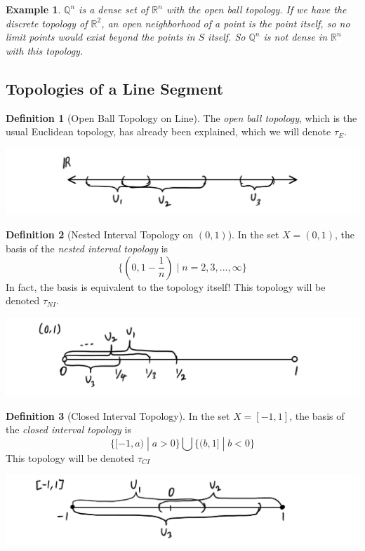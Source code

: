 \documentclass{article}
\newtheorem{example}{Example}[section]
\theoremstyle{remark}
\theoremstyle{definition}
\newtheorem{definition}{Definition}[section]
\begin{document}
\begin{example}
$\mathbb{Q}^{n}$ is a dense set of $\mathbb{R}^{n}$ with the open ball topology. If we have the discrete topology of $\mathbb{R}^{2}$, an open neighborhood of a point is the point itself, so no limit points would exist beyond the points in $S$ itself. So $\mathbb{Q}^{n}$ is not dense in $\mathbb{R}^{n}$ with this topology. 
\end{example}

\subsection{Topologies of a Line Segment}
\begin{definition}[Open Ball Topology on Line]
The \textit{open ball topology}, which is the usual Euclidean topology, has already been explained, which we will denote $\tau_{E}$. 
\begin{center}
    \includegraphics[scale=0.25]{img/Open_Ball_Topology_on_Line.PNG}
\end{center}
\end{definition}

\begin{definition}[Nested Interval Topology on $(0,1)$]
In the set $X = (0,1)$, the basis of the \textit{nested interval topology} is 
\[ \Big\{ (0, 1-\frac{1}{n}) \; | \; n = 2, 3, ..., \infty \Big\} \]
In fact, the basis is equivalent to the topology itself! This topology will be denoted $\tau_{NI}$.
\begin{center}
    \includegraphics[scale=0.25]{img/Nested_Interval_Topology.PNG}
\end{center}
\end{definition}

\begin{definition}[Closed Interval Topology]
In the set $X = [-1, 1]$, the basis of the \textit{closed interval topology} is 
\[ \big\{ [-1, a) \; | \; a>0 \big\} \bigcup \big\{ (b, 1] \; | \; b<0 \big\} \]
This topology will be denoted $\tau_{CI}$
\begin{center}
    \includegraphics[scale=0.25]{img/Closed_Interval_Topology.PNG}
\end{center}
\end{definition}
\end{document}
